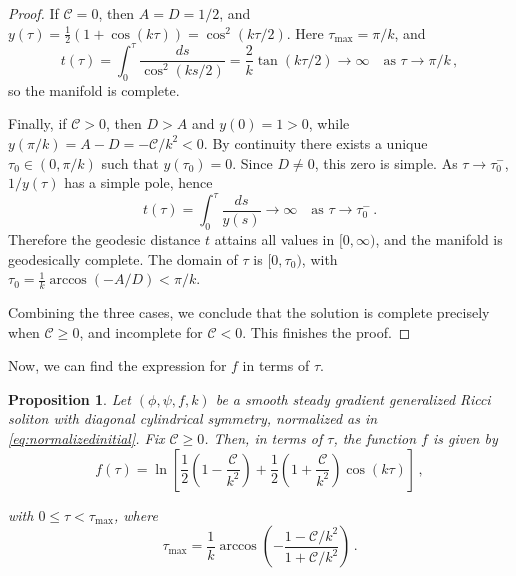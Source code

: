 \documentclass[12pt,a4paper,reqno]{amsart}
\theoremstyle{plain}
\newtheorem{proposition}[theorem]{Proposition}
\theoremstyle{remark}
\numberwithin{equation}{section}
\newcommand{\cC}{\mathcal{C}}
\begin{document}
\begin{proof}
If $\cC = 0$, then $A = D = 1/2$, and $y(\tau) = \frac12(1+\cos(k\tau)) = \cos^2(k\tau/2)$. Here $\tau_{\max} = \pi/k$, and
\begin{equation*}
t(\tau) = \int_0^\tau \frac{ds}{\cos^2(ks/2)} = \frac{2}{k}\tan(k\tau/2) \longrightarrow \infty \quad \text{as } \tau \to \pi/k \,,
\end{equation*}
so the manifold is complete.

Finally, if $\cC > 0$, then $D > A$ and $y(0)=1>0$, while $y(\pi/k) = A - D = -\cC/k^2 < 0$. By continuity there exists a unique $\tau_0 \in (0,\pi/k)$ such that $y(\tau_0)=0$. Since $D \neq 0$, this zero is simple. As $\tau \to \tau_0^-$, $1/y(\tau)$ has a simple pole, hence
\begin{equation*}
t(\tau) = \int_0^\tau \frac{ds}{y(s)} \longrightarrow \infty \quad \text{as } \tau \to \tau_0^- \,.
\end{equation*}
Therefore the geodesic distance $t$ attains all values in $[0,\infty)$, and the manifold is geodesically complete. The domain of $\tau$ is $[0,\tau_0)$, with $\tau_0 = \frac{1}{k}\arccos(-A/D) < \pi/k$.

Combining the three cases, we conclude that the solution is complete precisely when $\cC \ge 0$, and incomplete for $\cC < 0$. This finishes the proof.
\end{proof}

Now, we can find the expression for $f$ in terms of $\tau$.

\begin{proposition}\label{lemma:ftau}
Let $(\phi,\psi,f,k)$ be a smooth steady gradient generalized Ricci soliton with diagonal cylindrical symmetry, normalized as in \eqref{eq:normalizedinitial}. Fix $\cC\ge 0$. Then, in terms of $\tau$, the function $f$ is given by
\begin{equation}\label{eq:fsolutionCgeneral}
f(\tau) = \ln\left[\frac{1}{2}\left(1-\frac{\cC}{k^2}\right) + \frac{1}{2}\left(1+\frac{\cC}{k^{2}}\right)\cos(k\tau) \right] \,,
\end{equation}

with $0\le\tau<\tau_{\max}$, where
\begin{equation}\label{eq:tmax}
\tau_{\max} = \frac{1}{k}\arccos\left(-\frac{1-\cC/k^{2}}{1+\cC/k^{2}}\right) \,.
\end{equation}
\end{proposition}
\end{document}
